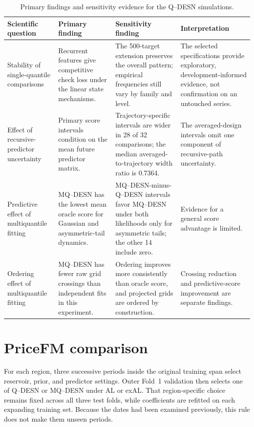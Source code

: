 \begin{table}[!htbp]
\centering
\small
\setlength{\tabcolsep}{4pt}
\renewcommand{\arraystretch}{1.12}
\caption{Primary findings and sensitivity evidence for the Q--DESN simulations.}
\label{qdesn2026:tab:supp-sensitivity-summary}
\begin{tabular}{@{}>{\raggedright\arraybackslash}p{}
>{\raggedright\arraybackslash}p{}
>{\raggedright\arraybackslash}p{}
>{\raggedright\arraybackslash}p{}@{}}
\toprule
Scientific question & Primary finding & Sensitivity finding & Interpretation \\
\midrule
Stability of single-quantile comparisons & Recurrent features give competitive check loss
under the linear state mechanisms. & The 500-target extension preserves the
overall pattern; empirical frequencies still vary by family and level. & The
selected specifications provide exploratory, development-informed evidence,
not confirmation on an untouched series. \\
Effect of recursive-predictor uncertainty & Primary score intervals condition on the mean future
predictor matrix. & Trajectory-specific intervals are wider in 28 of 32
comparisons; the median averaged-to-trajectory width ratio is 0.7364. & The
averaged-design intervals omit one component of recursive-path uncertainty. \\
Predictive effect of multiquantile fitting & MQ--DESN has the lowest mean oracle score for Gaussian and
asymmetric-tail dynamics. & MQ--DESN-minus-Q--DESN intervals favor MQ--DESN
under both likelihoods only for asymmetric tails; the other 14 include zero. &
Evidence for a general score advantage is limited. \\
Ordering effect of multiquantile fitting & MQ--DESN has fewer raw grid crossings than independent
fits in this experiment. & Ordering improves more consistently than oracle
score, and projected grids are ordered by construction. & Crossing reduction
and predictive-score improvement are separate findings. \\
\bottomrule
\end{tabular}
\end{table}

\section{PriceFM comparison}
\label{app:qdesn-pricefm-support}

For each region, three successive periods inside the original training span
select reservoir, prior, and predictor settings. Outer Fold~1 validation then
selects one of Q--DESN or MQ--DESN under AL or exAL. That region-specific
choice remains fixed across all three test folds, while coefficients are
refitted on each expanding training set. Because the dates had been examined
previously, this rule does not make them unseen periods.


